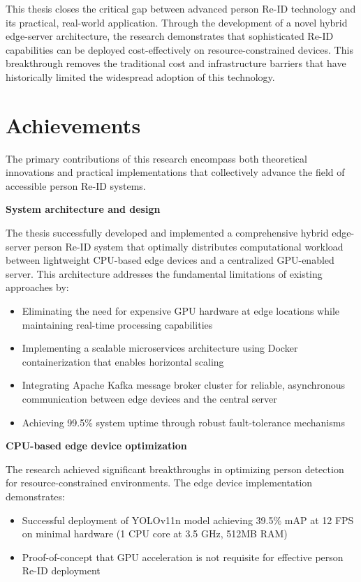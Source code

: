 \documentclass[../main.tex]{subfiles}
\begin{document}
This thesis closes the critical gap between advanced person Re-ID technology and its practical, real-world application. Through the development of a novel hybrid edge-server architecture, the research demonstrates that sophisticated Re-ID capabilities can be deployed cost-effectively on resource-constrained devices. This breakthrough removes the traditional cost and infrastructure barriers that have historically limited the widespread adoption of this technology.

\section{Achievements}

The primary contributions of this research encompass both theoretical innovations and practical implementations that collectively advance the field of accessible person Re-ID systems.

\textbf{System architecture and design}

The thesis successfully developed and implemented a comprehensive hybrid edge-server person Re-ID system that optimally distributes computational workload between lightweight CPU-based edge devices and a centralized GPU-enabled server. This architecture addresses the fundamental limitations of existing approaches by:

\begin{itemize}
    \item Eliminating the need for expensive GPU hardware at edge locations while maintaining real-time processing capabilities
    \item Implementing a scalable microservices architecture using Docker containerization that enables horizontal scaling
    \item Integrating Apache Kafka message broker cluster for reliable, asynchronous communication between edge devices and the central server
    \item Achieving 99.5\% system uptime through robust fault-tolerance mechanisms
\end{itemize}

\textbf{CPU-based edge device optimization}

The research achieved significant breakthroughs in optimizing person detection for resource-constrained environments. The edge device implementation demonstrates:

\begin{itemize}
    \item Successful deployment of YOLOv11n model achieving 39.5\% mAP at 12 FPS on minimal hardware (1 CPU core at 3.5 GHz, 512MB RAM)
    \item Proof-of-concept that GPU acceleration is not requisite for effective person Re-ID deployment
\end{itemize}
\end{document}
